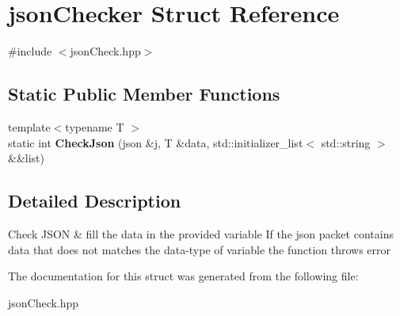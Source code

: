 \hypertarget{structjsonChecker}{}\section{json\+Checker Struct Reference}
\label{structjsonChecker}


{\ttfamily \#include $<$json\+Check.\+hpp$>$}

\subsection*{Static Public Member Functions}
\begin{DoxyCompactItemize}
\item 
{\footnotesize template$<$typename T $>$ }\\static int {\bfseries Check\+Json} (json \&j, T \&data, std\+::initializer\+\_\+list$<$ std\+::string $>$ \&\&list)\hypertarget{structjsonChecker_a28d25a5eea6da1a66ba94516dbded697}{}\label{structjsonChecker_a28d25a5eea6da1a66ba94516dbded697}

\end{DoxyCompactItemize}


\subsection{Detailed Description}
Check J\+S\+ON \& fill the data in the provided variable If the json packet contains data that does not matches the data-\/type of variable the function throws error 

The documentation for this struct was generated from the following file\+:\begin{DoxyCompactItemize}
\item 
json\+Check.\+hpp\end{DoxyCompactItemize}

